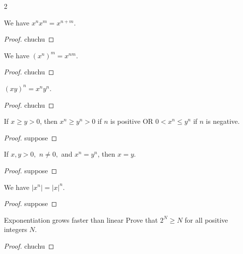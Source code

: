 \begin{multicols}{2}
\begin{proposition} We have $x^n x^m = x^{n + m}$.
\end{proposition}
\begin{proof}
    chuchu
\end{proof}

\begin{proposition} We have $(x^n)^m=x^{nm}.$
\end{proposition}
\begin{proof}
    chuchu
\end{proof}

\begin{proposition} $(xy)^n=x^n y^n.$
\end{proposition}
\begin{proof}
    chuchu
\end{proof}

\begin{proposition}
    If $x \geq y > 0$, then $x^n \geq y^n > 0$ if $n$ is positive OR $0 < x^n \leq y^n$ if $n$ is negative.
\end{proposition}
\begin{proof}
    suppose
\end{proof}

\begin{proposition}
    If $x, y > 0,$ $n \neq 0,$ and $x^n = y^n$, then $x = y$.
\end{proposition}
\begin{proof}
    suppose
\end{proof}

\begin{proposition}
    We have $\lvert x^n \rvert = \lvert x \rvert ^n$.
\end{proposition}
\begin{proof}
    suppose
\end{proof}
\end{multicols}

\begin{problem}{Exponentiation grows faster than linear}
    Prove that $2^N \geq N$ for all positive integers $N$.
\end{problem}
\begin{proof}
    chuchu
\end{proof}